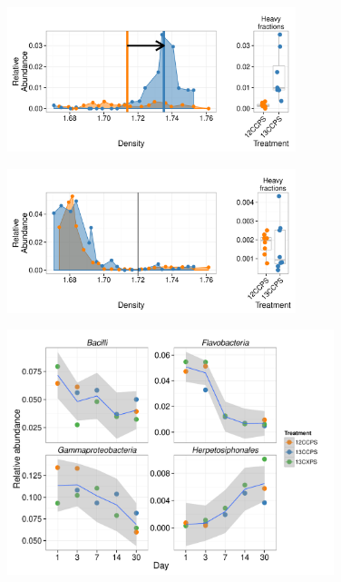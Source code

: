 \begin{figure}[H] \begin{center}
\centerline{\includegraphics[width=0.75\textwidth]{figures/conceptual1/conceptual1.pdf}}
\caption{\protect}\label{fig:c1}
\end{center} \end{figure}

\begin{figure}[H] \begin{center}
\centerline{\includegraphics[width=0.75\textwidth]{figures/conceptual3/conceptual3.pdf}}
\caption{\protect}\label{fig:c3}
\end{center} \end{figure}

\begin{figure}[H]
	\begin{center}
    \centerline{\includegraphics[width=0.85\textwidth]{figures/abndVtime_class/abndVtime_class.pdf}}
	\caption{\protect}\label{fig:time_class}
    \end{center}
\end{figure}

